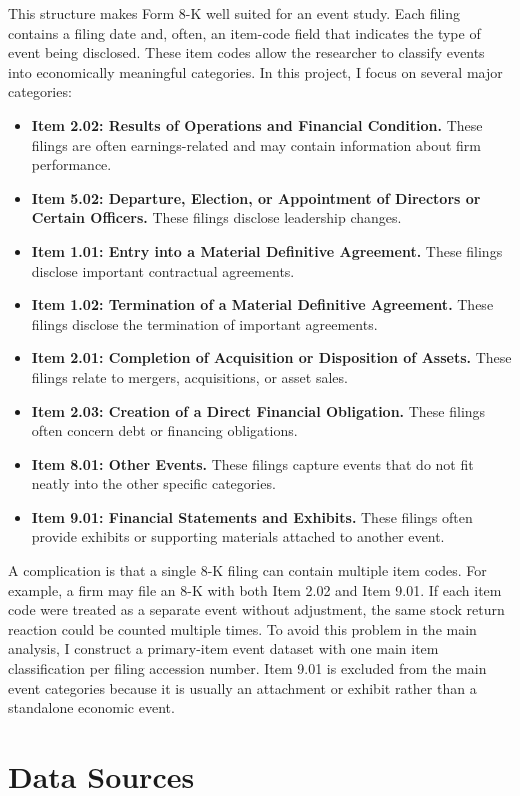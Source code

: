 \documentclass[12pt]{article}
\begin{document}
	This structure makes Form 8-K well suited for an event study. Each filing contains a filing date and, often, an item-code field that indicates the type of event being disclosed. These item codes allow the researcher to classify events into economically meaningful categories. In this project, I focus on several major categories:
	
	\begin{itemize}
		\item \textbf{Item 2.02: Results of Operations and Financial Condition.} These filings are often earnings-related and may contain information about firm performance.
		\item \textbf{Item 5.02: Departure, Election, or Appointment of Directors or Certain Officers.} These filings disclose leadership changes.
		\item \textbf{Item 1.01: Entry into a Material Definitive Agreement.} These filings disclose important contractual agreements.
		\item \textbf{Item 1.02: Termination of a Material Definitive Agreement.} These filings disclose the termination of important agreements.
		\item \textbf{Item 2.01: Completion of Acquisition or Disposition of Assets.} These filings relate to mergers, acquisitions, or asset sales.
		\item \textbf{Item 2.03: Creation of a Direct Financial Obligation.} These filings often concern debt or financing obligations.
		\item \textbf{Item 8.01: Other Events.} These filings capture events that do not fit neatly into the other specific categories.
		\item \textbf{Item 9.01: Financial Statements and Exhibits.} These filings often provide exhibits or supporting materials attached to another event.
	\end{itemize}
	
	A complication is that a single 8-K filing can contain multiple item codes. For example, a firm may file an 8-K with both Item 2.02 and Item 9.01. If each item code were treated as a separate event without adjustment, the same stock return reaction could be counted multiple times. To avoid this problem in the main analysis, I construct a primary-item event dataset with one main item classification per filing accession number. Item 9.01 is excluded from the main event categories because it is usually an attachment or exhibit rather than a standalone economic event.
	
	\section{Data Sources}
	
\end{document}
